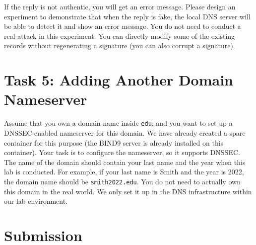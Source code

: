 If the reply is not authentic, you will get an error message. 
Please design an experiment to demonstrate that when the reply 
is fake, the local DNS server will be able to detect it and 
show an error message. You do not need to conduct a real attack 
in this experiment. You can directly modify some of the existing
records without regenerating a signature (you can also corrupt 
a signature). 


\section{Task 5: Adding Another Domain Nameserver} 

Assume that you own a domain name inside \texttt{edu}, 
and you want to 
set up a DNSSEC-enabled nameserver for this domain. We have already
created a spare container for this purpose (the BIND9 server is already
installed on this container).
Your task is to configure the nameserver, so it supports DNSSEC.
The name of the domain should contain your last name and the year
when this lab is conducted. For example, if your last name is Smith and
the year is 2022, the domain name should be \texttt{smith2022.edu}. 
You do not need to actually own this domain in the real world. We only 
set it up in the DNS infrastructure within our lab environment.



\section{Submission}





